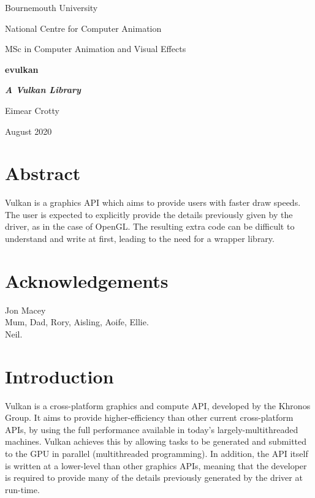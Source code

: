 \documentclass[12pt]{report}
\theoremstyle{definition}
\begin{document}
  \renewcommand{\familydefault}{\sfdefault}
  \selectfont

  \begin{titlepage}
    \centering
    {\Huge Bournemouth University\par}
    \vspace{0.5cm}
    {\Large National Centre for Computer Animation\par}
    \vspace{0.5cm}
    {\Large MSc in Computer Animation and Visual Effects\par}
    \vspace{5cm}
    {\huge \bfseries evulkan\par}
    \vspace{0.5cm}
    {\Large \bfseries \textit{A Vulkan Library}\par}
    \vspace{2cm}
    {\Large Eimear Crotty\par}
    \vfill
    {\Large August 2020}
  \end{titlepage}

  \chapter*{Abstract}
    Vulkan is a graphics API which aims to provide users with faster draw speeds.
    The user is expected to explicitly provide the details previously given by
    the driver, as in the case of OpenGL. The resulting extra code can be
    difficult to understand and write at first, leading to the need for a 
    wrapper library.

  \chapter*{Acknowledgements}

    \vspace{1cm}
    Jon Macey\\
    Mum, Dad, Rory, Aisling, Aoife, Ellie.\\
    Neil.

  \tableofcontents

  \chapter{Introduction}
    Vulkan is a cross-platform graphics and compute API, developed by the
    Khronos Group. It aims to provide higher-efficiency than other current
    cross-platform APIs, by using the full performance available in today's
    largely-multithreaded machines. Vulkan achieves this by allowing tasks to be
    generated and submitted to the GPU in parallel (multithreaded programming).
    In addition, the API itself is written at a lower-level than other graphics
    APIs, meaning that the developer is required to provide many of the details
    previously generated by the driver at run-time.\\
\end{document}
